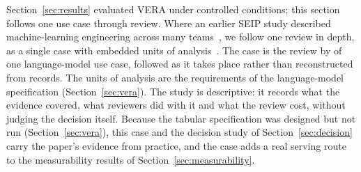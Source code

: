 
Section~\ref{sec:results} evaluated VERA under controlled conditions; this section follows one use case through review.
Where an earlier SEIP study described machine-learning engineering across many teams~\cite{amershi2019software}, we follow one review in depth, as a single case with embedded units of analysis~\cite{runeson2009guidelines}.
The case is the review by \aicc{} of one language-model use case, followed as it takes place rather than reconstructed from records.
The units of analysis are the requirements of the language-model specification (Section~\ref{sec:vera}).
The study is descriptive: it records what the evidence covered, what reviewers did with it and what the review cost, without judging the decision itself.
\ifarmwithdrawn
Because the tabular specification was designed but not run (Section~\ref{sec:vera}), this case and the decision study of Section~\ref{sec:decision} carry the paper's evidence from practice, and the case adds a real serving route to the measurability results of Section~\ref{sec:measurability}.
\fi

